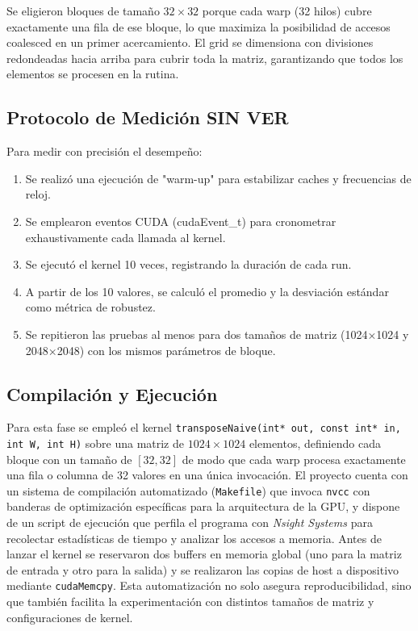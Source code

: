 \documentclass[a4paper,11pt]{article}
\begin{document}
Se eligieron bloques de tamaño $32\times32$ porque cada warp (32 hilos) cubre exactamente una fila de ese bloque, lo que maximiza la posibilidad de accesos coalesced en un primer acercamiento. El grid se dimensiona con divisiones redondeadas hacia arriba para cubrir toda la matriz, garantizando que todos los elementos se procesen en la rutina.

\subsection{Protocolo de Medición SIN VER}
Para medir con precisión el desempeño:
\begin{enumerate}[noitemsep]
  \item Se realizó una ejecución de "warm-up" para estabilizar caches y frecuencias de reloj.
  \item Se emplearon eventos CUDA (cudaEvent\_t) para cronometrar exhaustivamente cada llamada al kernel.
  \item Se ejecutó el kernel 10 veces, registrando la duración de cada run.
  \item A partir de los 10 valores, se calculó el promedio y la desviación estándar como métrica de robustez.
  \item Se repitieron las pruebas al menos para dos tamaños de matriz (1024×1024 y 2048×2048) con los mismos parámetros de bloque.
\end{enumerate}

\subsection{Compilación y Ejecución}
Para esta fase se empleó el kernel \texttt{transposeNaive(int* out, const int* in, int W, int H)} sobre una matriz de \(1024\times1024\) elementos, definiendo cada bloque con un tamaño de \([32,32]\) de modo que cada warp procesa exactamente una fila o columna de 32 valores en una única invocación. El proyecto cuenta con un sistema de compilación automatizado (\texttt{Makefile}) que invoca \texttt{nvcc} con banderas de optimización específicas para la arquitectura de la GPU, y dispone de un script de ejecución que perfila el programa con \textit{Nsight Systems} para recolectar estadísticas de tiempo y analizar los accesos a memoria. Antes de lanzar el kernel se reservaron dos buffers en memoria global (uno para la matriz de entrada y otro para la salida) y se realizaron las copias de host a dispositivo mediante \texttt{cudaMemcpy}. Esta automatización no solo asegura reproducibilidad, sino que también facilita la experimentación con distintos tamaños de matriz y configuraciones de kernel.
\end{document}
